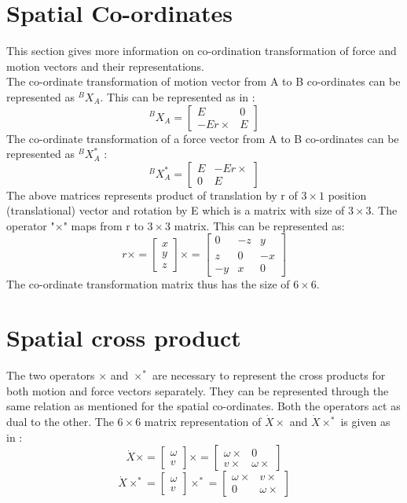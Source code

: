 \section{Spatial Co-ordinates}
\label{Spatial}
This section gives more information on co-ordination transformation of force and motion vectors and their representations.\\
The co-ordinate transformation of motion vector from A to B co-ordinates can be represented as ${}^{B}X_{A}$. This can be represented as in \cite{featherstone2014rigid}:
\[ {}^{B}X_{A} =
\begin{bmatrix}
	E & 0 \\ -Er\times & E
\end{bmatrix}
\]
The co-ordinate transformation of a force vector from A to B co-ordinates can be represented as ${}^{B}X^{*}_{A}$ :
\[{}^{B}X^{*}_{A} =
\begin{bmatrix}
E & -Er\times\\ 0 & E
\end{bmatrix}
\]
The above matrices represents product of translation by r of $3\times1$ position (translational) vector and rotation by E which is a matrix with size of $3\times3$. The operator "$\times$" maps from r to $3\times3$ matrix. This can be represented as:
\[ r\times =
\begin{bmatrix}
x \\ y \\ z
\end{bmatrix} \times = 
\begin{bmatrix}0 & -z & y \\ z & 0 & -x\\-y & x & 0\end{bmatrix}
\]
The co-ordinate transformation matrix thus has the size of $6\times6$.

 
\section{Spatial cross product}
\label{cross}
The two operators $\times$ and $\times^*$ are necessary to represent the cross products for both motion and force vectors separately. They can be represented through the same relation as mentioned for the spatial co-ordinates. Both the operators act as dual to the other. The $6\times6$ matrix representation of $\dot{X}\times$ and $\dot{X}\times^*$ is given as in \cite{featherstone2014rigid}:
\[ \dot{X}\times =
\begin{bmatrix}
\omega\\ v
\end{bmatrix} \times = 
\begin{bmatrix}
\omega\times & 0\\ v\times & \omega\times
\end{bmatrix}
\]
\[ \dot{X}\times^* =
\begin{bmatrix}
\omega\\ v
\end{bmatrix} \times^* = 
\begin{bmatrix}
\omega\times & v\times\\ 0 & \omega\times
\end{bmatrix}
\]

